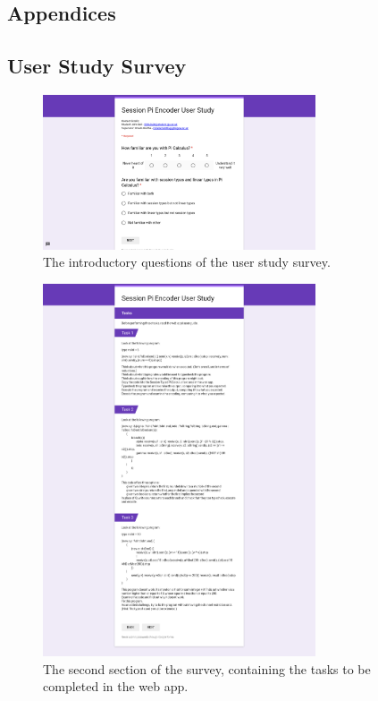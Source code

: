 \documentclass{l4proj}
\begin{document}
%
% 

\begin{appendices}

\chapter{Appendices}
\label{append}

\section{User Study Survey}
\label{appSurvey}

\begin{figure}[H]
\centering
\includegraphics[width=0.72\textwidth]{images/SurveyPart1.png}
\caption{The introductory questions of the user study survey.}
\label{fig:surveyPart1}
\end{figure}

\begin{figure}[H]
\centering
\includegraphics[width=0.72\textwidth]{images/SurveyPart2.png}
\caption{The second section of the survey, containing the tasks to be completed in the web app.}
\label{fig:surveyPart2}
\end{figure}


\end{appendices}
\end{document}
